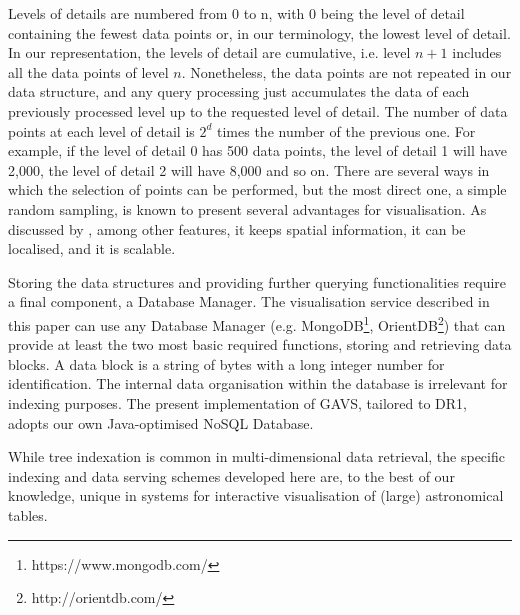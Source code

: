 \documentclass[longauth, final]{aa}
\begin{document}
Levels of details are numbered from 0 to n, with 0 being the level of detail containing the fewest data points or, in our terminology, the lowest level of detail. In our representation, the levels of detail are cumulative, i.e. level $n+1$ includes all the data points of level $n$. Nonetheless, the data points are not repeated in our data structure, and any query processing just accumulates the data of each previously processed level up to the requested level of detail. The number of data points at each level of detail is $2^d$ times the number of the previous one. For example, if the level of detail 0 has 500 data points, the level of detail 1 will have 2,000, the level of detail 2 will have 8,000 and so on. There are several ways in which the selection of points can be performed, but the most direct one, a simple random sampling, is known to present several advantages for visualisation. As discussed by \cite{4376143}, among other features, it keeps spatial information, it can be localised, and it is scalable.


Storing the data structures and providing further querying functionalities require a final component, a Database Manager. The visualisation service described in this paper can use any Database Manager (e.g. MongoDB\footnote{https://www.mongodb.com/}, OrientDB\footnote{http://orientdb.com/}) that can provide at least the two most basic required functions, storing and retrieving data blocks. A data block is a string of bytes with a long integer number for identification. The internal data organisation within the database is irrelevant for indexing purposes. The present implementation of GAVS, tailored to DR1, adopts our own Java-optimised NoSQL Database.

While tree indexation is common in multi-dimensional data retrieval, the specific indexing and data serving schemes  developed here are, to the best of our knowledge, unique in systems for interactive visualisation of (large) astronomical tables.
\end{document}
